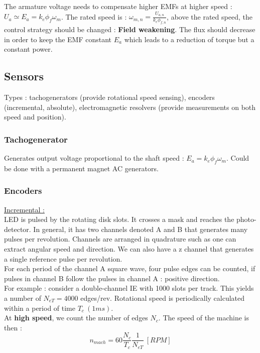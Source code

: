 \documentclass[../main.tex]{subfiles}
\begin{document}
The armature voltage needs to compensate higher EMFs at higher speed : $U_a \simeq E_a = k_e \phi_f \omega_m$. The rated speed is : $\omega_{m,n}= \frac{U_{a,n}}{k_e \phi_{f,n}}$, above the rated speed, the control strategy should be changed : \textbf{Field weakening}. The flux should decrease in order to keep the EMF constant $E_a$ which leads to a reduction of torque but a constant power. 



\subsection{Sensors}

Types : tachogenerators (provide rotational speed sensing), encoders (incremental, absolute), electromagnetic resolvers (provide measurements on both speed and position).\\

\subsubsection{Tachogenerator}
Generates output voltage proportional to the shaft speed : $E_a = k_e\phi_f \omega_m$. Could be done with a permanent magnet AC generators. \\

\subsubsection{Encoders}
\quad \underline{Incremental : } \\
LED is pulsed by the rotating disk slots. It crosses a mask and reaches the photo-detector. In general, it has two channels denoted A and B that generates many pulses per revolution. Channels are arranged in quadrature such as one can extract angular speed and direction. We can also have a z channel that generates a single reference pulse per revolution.\\
For each period of the channel A square wave, four pulse edges can be counted, if pulses in channel B follow the pulses in channel A : positive direction. \\

For example : consider a double-channel IE with 1000 slots per track. This yields a number of $N_{eT} = 4000$ edges/rev. Rotational speed is periodically calculated within a period of time $T_c \: (1ms)$. \\
At \textbf{high speed}, we count the number of edges $N_c$. The speed of the machine is then : \begin{equation}
    n_{mach} = 60 \frac{N_c}{T_c} \frac{1}{N_{eT}} \: [RPM]
\end{equation}
\end{document}

